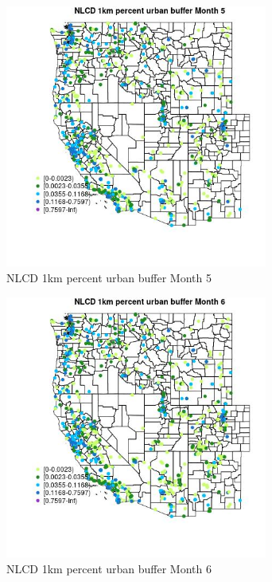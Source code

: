 \begin{figure} 
\centering  
\includegraphics[width=0.77\textwidth]{Code_Outputs/Report_ML_input_PM25_Step4_part_f_de_duplicated_aves_prioritize_24hr_obswNAs_MapObsMo5NLCD_1km_percent_urban_buffer.jpg} 
\caption{\label{fig:Report_ML_input_PM25_Step4_part_f_de_duplicated_aves_prioritize_24hr_obswNAsMapObsMo5NLCD_1km_percent_urban_buffer}NLCD 1km percent urban buffer Month 5} 
\end{figure} 
 

\begin{figure} 
\centering  
\includegraphics[width=0.77\textwidth]{Code_Outputs/Report_ML_input_PM25_Step4_part_f_de_duplicated_aves_prioritize_24hr_obswNAs_MapObsMo6NLCD_1km_percent_urban_buffer.jpg} 
\caption{\label{fig:Report_ML_input_PM25_Step4_part_f_de_duplicated_aves_prioritize_24hr_obswNAsMapObsMo6NLCD_1km_percent_urban_buffer}NLCD 1km percent urban buffer Month 6} 
\end{figure} 
 

